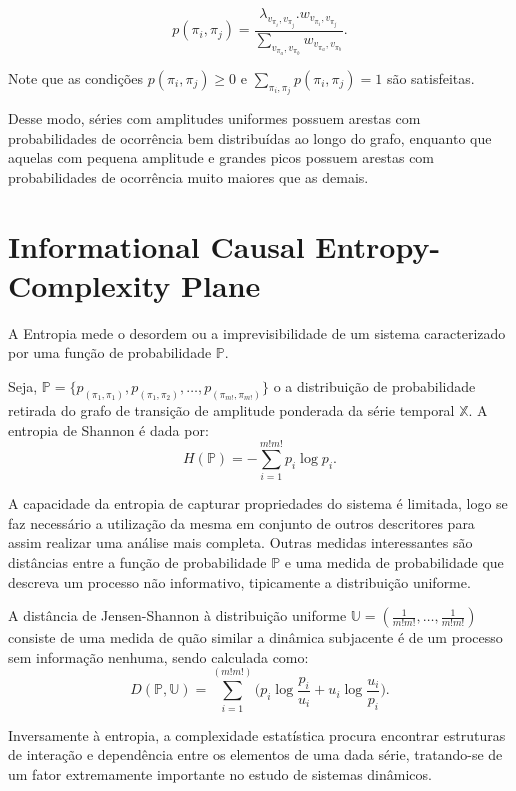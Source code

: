 \documentclass[12pt]{article}
\begin{document}
\begin{equation}
    p(\pi_i, \pi_j) = \frac{\lambda_{v_{\pi_i}, v_{\pi_j}} . w_{v_{\pi_i}, v_{\pi_j}}}{\sum_{v_{\pi_a}, v_{\pi_b}} w_{v_{\pi_a}, v_{\pi_b}}}.
\end{equation}

Note que as condições $p(\pi_i, \pi_j) \ge 0$ e $\sum_{\pi_i, \pi_j} p(\pi_i, \pi_j) = 1$ são  satisfeitas.

Desse modo, séries com amplitudes uniformes possuem arestas com probabilidades de ocorrência bem distribuídas ao longo do grafo, enquanto que aquelas com pequena amplitude e grandes picos possuem arestas com probabilidades de ocorrência muito maiores que as demais.

\section{Informational Causal Entropy-Complexity Plane}\label{HC}

A Entropia mede o desordem ou a imprevisibilidade de um sistema caracterizado por uma função de probabilidade $\mathbb{P}$.

Seja, $\mathbb{P} = \{p_{(\pi_1, \pi_1)}, p_{(\pi_1, \pi_2)}, \dots, p_{(\pi_{m!}, \pi_{m!})}\}$ o a distribuição de probabilidade retirada do grafo de transição de amplitude ponderada da série temporal $\mathbb{X}$.
A entropia de Shannon é dada por:
\begin{equation}
H(\mathbb{P}) = -\sum_{i=1}^{m!m!} p_i \log p_i .
\label{eq:Entropia}
\end{equation}

A capacidade da entropia de capturar propriedades do sistema é limitada, logo se faz necessário a utilização da mesma em conjunto de outros descritores para assim realizar uma análise mais completa.
Outras medidas interessantes são distâncias entre a função de probabilidade $\mathbb{P}$ e uma medida de probabilidade que descreva um processo não informativo, tipicamente a distribuição uniforme.

A distância de Jensen-Shannon à distribuição uniforme $ \mathbb{U} = (\frac{1}{m!m!},\dots,\frac{1}{m!m!})$ consiste de uma medida de quão similar a dinâmica subjacente é de um processo sem informação nenhuma, sendo calculada como:
\begin{equation}
D(\mathbb{P}, \mathbb{U}) = \sum_{i=1}^{(m!m!)} \Big(p_i \log\frac{p_i}{u_i} +
u_i \log\frac{u_i}{p_i}
\Big).
\end{equation}

Inversamente à entropia, a complexidade estatística procura encontrar estruturas de interação e dependência entre os elementos de uma dada série, tratando-se de um fator extremamente importante no estudo de sistemas dinâmicos.
\end{document}
